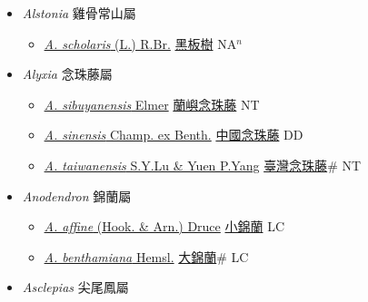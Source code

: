 
  \begin{itemize}
 \item[] \textit{Alstonia} 雞骨常山屬
                    
  \begin{itemize}
        \item[] \href{http://www.theplantlist.org/tpl1.1/search?q=Alstonia+scholaris}{\textit{A. scholaris} (L.) R.Br.}   \href{\detokenize{http://taibnet.sinica.edu.tw/chi/taibnet_species_list.php?T2=黑板樹&T2_new_value=true&fr=y}}{黑板樹} NA$^n$
  \end{itemize}
 \item[] \textit{Alyxia} 念珠藤屬
                    
  \begin{itemize}
        \item[] \href{http://www.theplantlist.org/tpl1.1/search?q=Alyxia+sibuyanensis}{\textit{A. sibuyanensis} Elmer}   \href{\detokenize{http://taibnet.sinica.edu.tw/chi/taibnet_species_list.php?T2=蘭嶼念珠藤&T2_new_value=true&fr=y}}{蘭嶼念珠藤} NT
        \item[] \href{http://www.theplantlist.org/tpl1.1/search?q=Alyxia+sinensis}{\textit{A. sinensis} Champ. ex Benth.}   \href{\detokenize{http://taibnet.sinica.edu.tw/chi/taibnet_species_list.php?T2=中國念珠藤&T2_new_value=true&fr=y}}{中國念珠藤} DD
        \item[] \href{http://www.theplantlist.org/tpl1.1/search?q=Alyxia+taiwanensis}{\textit{A. taiwanensis} S.Y.Lu \& Yuen P.Yang}   \href{\detokenize{http://taibnet.sinica.edu.tw/chi/taibnet_species_list.php?T2=臺灣念珠藤&T2_new_value=true&fr=y}}{臺灣念珠藤}\# NT
  \end{itemize}
 \item[] \textit{Anodendron} 錦蘭屬
                    
  \begin{itemize}
        \item[] \href{http://www.theplantlist.org/tpl1.1/search?q=Anodendron+affine}{\textit{A. affine} (Hook. \& Arn.) Druce}   \href{\detokenize{http://taibnet.sinica.edu.tw/chi/taibnet_species_list.php?T2=小錦蘭&T2_new_value=true&fr=y}}{小錦蘭} LC
        \item[] \href{http://www.theplantlist.org/tpl1.1/search?q=Anodendron+benthamiana}{\textit{A. benthamiana} Hemsl.}   \href{\detokenize{http://taibnet.sinica.edu.tw/chi/taibnet_species_list.php?T2=大錦蘭&T2_new_value=true&fr=y}}{大錦蘭}\# LC
  \end{itemize}
 \item[] \textit{Asclepias} 尖尾鳳屬
                    

\end{itemize}
